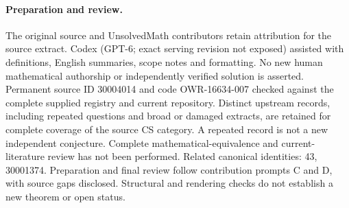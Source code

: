 \documentclass[11pt]{article}
\begin{document}
\paragraph{Preparation and review.}
The original source and UnsolvedMath contributors retain attribution for the source extract. Codex (GPT-6; exact serving revision not exposed) assisted with definitions, English summaries, scope notes and formatting. No new human mathematical authorship or independently verified solution is asserted. Permanent source ID 30004014 and code OWR-16634-007 checked against the complete supplied registry and current repository. Distinct upstream records, including repeated questions and broad or damaged extracts, are retained for complete coverage of the source CS category. A repeated record is not a new independent conjecture. Complete mathematical-equivalence and current-literature review has not been performed. Related canonical identities: 43, 30001374. Preparation and final review follow contribution prompts C and D, with source gaps disclosed. Structural and rendering checks do not establish a new theorem or open status.
\label{end:30004014}
\end{document}
